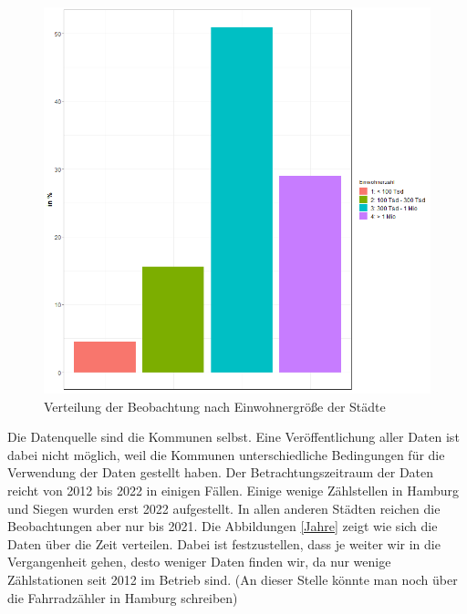 \documentclass[a4paper,12pt]{thesis}
\begin{document}
\begin{figure}[!ht]
	\centering
	\includegraphics[width=\textwidth]{Plots/plot10.png}
	\caption{Verteilung der Beobachtung nach Einwohnergröße der Städte}
	\label{Einwohnergroese}
\end{figure}

Die Datenquelle sind die Kommunen selbst. Eine Veröffentlichung aller Daten ist dabei nicht möglich, weil die Kommunen unterschiedliche Bedingungen für die Verwendung der Daten gestellt haben. Der Betrachtungszeitraum der Daten reicht von 2012 bis 2022 in einigen Fällen. Einige wenige Zählstellen in Hamburg und Siegen wurden erst 2022 aufgestellt. In allen anderen Städten reichen die Beobachtungen aber nur bis 2021. Die Abbildungen \ref{Jahre} zeigt wie sich die Daten über die Zeit verteilen. Dabei ist festzustellen, dass je weiter wir in die Vergangenheit gehen, desto weniger Daten finden wir, da nur wenige Zählstationen seit 2012 im Betrieb sind. (An dieser Stelle könnte man noch über die Fahrradzähler in Hamburg schreiben)
\end{document}
